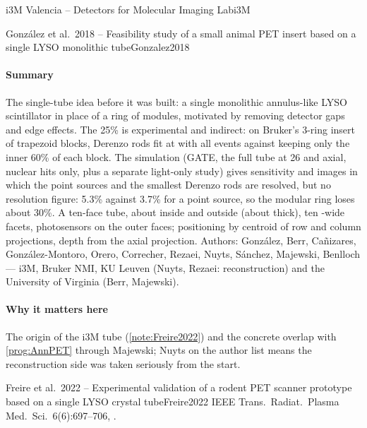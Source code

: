 \begin{programnote}{i3M Valencia -- Detectors for Molecular Imaging Lab}{i3M}
\begin{papernote}{González et al.\ 2018 -- Feasibility study of a small animal PET insert based on a single LYSO monolithic tube}{Gonzalez2018}
\paragraph{Summary}
The single-tube idea before it was built: a single monolithic annulus-like
LYSO scintillator in place of a ring of modules, motivated by removing
detector gaps and edge effects. The 25\% is experimental and indirect: on
Bruker's 3-ring insert of trapezoid blocks,  Derenzo rods fit at
 with all events against  keeping only the inner 60\% of each
block. The simulation (GATE, the full tube at 26 and  axial, nuclear
hits only, plus a separate light-only study) gives sensitivity and images in which the
point sources and the smallest Derenzo rods are resolved, but no resolution figure:
5.3\% against 3.7\% for a point source, so the modular ring loses about 30\%. A ten-face tube, about
 inside and  outside (about  thick), ten -wide facets,
photosensors on the outer faces; positioning by centroid of row and column
projections, depth from the axial projection.
Authors: González, Berr, Cañizares, González-Montoro, Orero, Correcher,
Rezaei, Nuyts, Sánchez, Majewski, Benlloch --- i3M, Bruker NMI, KU Leuven
(Nuyts, Rezaei: reconstruction) and the University of Virginia (Berr, Majewski).

\paragraph{Why it matters here}
The origin of the i3M tube (\ref{note:Freire2022}) and the concrete overlap
with \ref{prog:AnnPET} through Majewski; Nuyts on the author list means the
reconstruction side was taken seriously from the start.

\end{papernote}

\begin{papernote}{Freire et al.\ 2022 -- Experimental validation of a rodent PET scanner prototype based on a single LYSO crystal tube}{Freire2022}
IEEE Trans.\ Radiat.\ Plasma Med.\ Sci.\ 6(6):697--706, .


\end{papernote}
\end{programnote}
